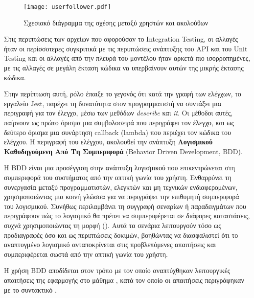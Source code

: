 \begin{figure}[H]
  \begin{center}
    \texttt{[image: userfollower.pdf]}
    \caption{Σχεσιακό διάγραμμα της σχέσης μεταξύ χρηστών και ακολούθων}
  \label{fig:userFollower}
    \end{center}
\end{figure}

Στις περιπτώσεις των αρχείων που αφορούσαν το \textlatin{Integration
Testing}, οι αλλαγές ήταν οι περίσσοτερες συγκριτικά με τις
περιπτώσεις ανάπτυξης του \textlatin{API} και του \textlatin{Unit
Testing} και οι αλλαγές από την πλευρά του μοντέλου ήταν αρκετά πιο
ισορροπημένες, με τις αλλαγές σε μεγάλη έκταση κώδικα να υπερβαίνουν
αυτών της μικρής έκτασης κώδικα.

Στην περίπτωση αυτή, ρόλο έπαιξε το γεγονός ότι κατά την γραφή των
ελέγχων, το εργαλείο \textlatin{Jest}, παρέχει τη δυνατότητα στον
προγραμματιστή να συντάξει μια περιγραφή για τον έλεγχο, μέσω των
μεθόδων \textit{\textlatin{describe}} και \textit{\textlatin{it}}. Οι
μέθοδοι αυτές, παίρνουν ως πρώτο όρισμα μια συμβολοσειρά που περιγράφει
τον έλεγχο, και ως δεύτερο όρισμα μια συνάρτηση \textlatin{callback} (\textlatin{lambda})
\cite{crockfordjavascript} που περιέχει τον κώδικα του ελέγχου. Η
περιγραφή του ελέγχου, ακολουθεί την ανάπτυξη \textbf{Λογισμικού
Καθοδηγούμενη Από Τη Συμπεριφορά} (\textlatin{Behavior Driven
Development, BDD}).

Η \textlatin{BDD} είναι μια προσέγγιση στην ανάπτυξη λογισμικού που
επικεντρώνεται στη συμπεριφορά του συστήματος από την οπτική γωνία του
χρήστη. Ενθαρρύνει τη συνεργασία μεταξύ προγραμματιστών, ελεγκτών και μη
τεχνικών ενδιαφερομένων, χρησιμοποιώντας μια κοινή γλώσσα για να
περιγράψει την επιθυμητή συμπεριφορά του λογισμικού. Συνήθως
περιλαμβάνει τη συγγραφή σεναρίων ή παραδειγμάτων που περιγράφουν πώς το
λογισμικό θα πρέπει να συμπεριφέρεται σε διάφορες καταστάσεις, συχνά
χρησιμοποιώντας τη μορφή 
(). Αυτά τα σενάρια λειτουργούν τόσο ως
προδιαγραφές όσο και ως περιπτώσεις δοκιμών, βοηθώντας να διασφαλιστεί
ότι το αναπτυγμένο λογισμικό ανταποκρίνεται στις προβλεπόμενες
απαιτήσεις και συμπεριφέρεται σωστά από την οπτική γωνία του χρήστη.
\cite{bddstudy,mughal2024advancingbddsoftwaretesting,bddsystematic}

Η χρήση \textlatin{BDD} αποδίδεται στον τρόπο με τον οποίο αναπτύχθηκαν λειτουργικές απαιτήσεις
της εφαρμογής στο μάθημα , κατά τον οποίο οι απαιτήσεις περιγράφηκαν με το συντακτικό .

